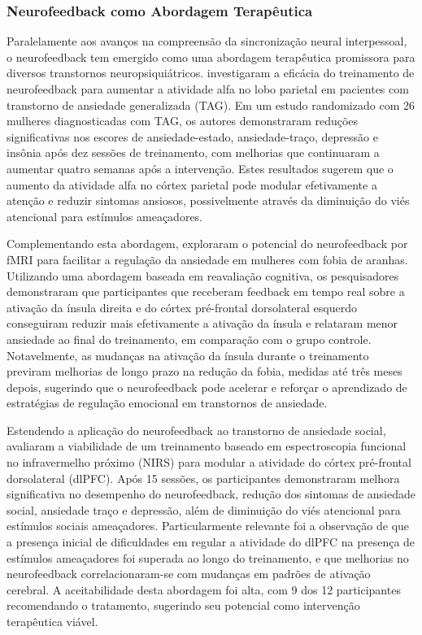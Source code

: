\subsubsection{Neurofeedback como Abordagem Terapêutica}
Paralelamente aos avanços na compreensão da sincronização neural interpessoal, o neurofeedback tem emergido como uma abordagem terapêutica promissora para diversos transtornos neuropsiquiátricos.  investigaram a eficácia do treinamento de neurofeedback para aumentar a atividade alfa no lobo parietal em pacientes com transtorno de ansiedade generalizada (TAG). Em um estudo randomizado com 26 mulheres diagnosticadas com TAG, os autores demonstraram reduções significativas nos escores de ansiedade-estado, ansiedade-traço, depressão e insônia após dez sessões de treinamento, com melhorias que continuaram a aumentar quatro semanas após a intervenção. Estes resultados sugerem que o aumento da atividade alfa no córtex parietal pode modular efetivamente a atenção e reduzir sintomas ansiosos, possivelmente através da diminuição do viés atencional para estímulos ameaçadores.

Complementando esta abordagem,  exploraram o potencial do neurofeedback por fMRI para facilitar a regulação da ansiedade em mulheres com fobia de aranhas. Utilizando uma abordagem baseada em reavaliação cognitiva, os pesquisadores demonstraram que participantes que receberam feedback em tempo real sobre a ativação da ínsula direita e do córtex pré-frontal dorsolateral esquerdo conseguiram reduzir mais efetivamente a ativação da ínsula e relataram menor ansiedade ao final do treinamento, em comparação com o grupo controle. Notavelmente, as mudanças na ativação da ínsula durante o treinamento previram melhorias de longo prazo na redução da fobia, medidas até três meses depois, sugerindo que o neurofeedback pode acelerar e reforçar o aprendizado de estratégias de regulação emocional em transtornos de ansiedade.

Estendendo a aplicação do neurofeedback ao transtorno de ansiedade social,  avaliaram a viabilidade de um treinamento baseado em espectroscopia funcional no infravermelho próximo (NIRS) para modular a atividade do córtex pré-frontal dorsolateral (dlPFC). Após 15 sessões, os participantes demonstraram melhora significativa no desempenho do neurofeedback, redução dos sintomas de ansiedade social, ansiedade traço e depressão, além de diminuição do viés atencional para estímulos sociais ameaçadores. Particularmente relevante foi a observação de que a presença inicial de dificuldades em regular a atividade do dlPFC na presença de estímulos ameaçadores foi superada ao longo do treinamento, e que melhorias no neurofeedback correlacionaram-se com mudanças em padrões de ativação cerebral. A aceitabilidade desta abordagem foi alta, com 9 dos 12 participantes recomendando o tratamento, sugerindo seu potencial como intervenção terapêutica viável.

